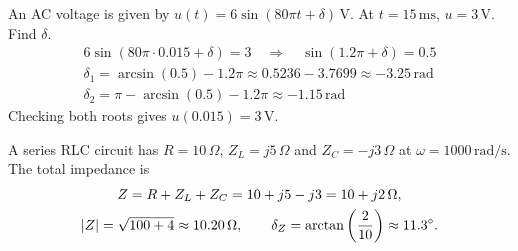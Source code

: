 \begin{exempel}
An AC voltage is given by $u(t) = 6\sin(80\pi t + \delta)\,\text{V}$. At $t = 15\,\text{ms}$,
$u = 3\,\text{V}$. Find $\delta$.
\begin{gather*}
  6\sin(80\pi \cdot 0.015 + \delta) = 3 \quad \Rightarrow \quad \sin(1.2\pi + \delta) = 0.5 \\
  \delta_1 = \arcsin(0.5) - 1.2\pi \approx 0.5236 - 3.7699 \approx -3.25\,\text{rad} \\
  \delta_2 = \pi - \arcsin(0.5) - 1.2\pi \approx -1.15\,\text{rad}
\end{gather*}
Checking both roots gives $u(0.015) = 3\,\text{V}$.
\end{exempel}

\begin{exempel}
A series RLC circuit has $R = 10\,\Omega$, $Z_L = j5\,\Omega$ and $Z_C = -j3\,\Omega$ at
$\omega = 1000\,\text{rad/s}$. The total impedance is
\begin{gather*}
  Z = R + Z_L + Z_C = 10 + j5 - j3 = 10 + j2\,\Omega, \\
  \lvert Z\rvert = \sqrt{100 + 4} \approx 10.20\,\Omega, \qquad
  \delta_Z = \arctan\left(\frac{2}{10}\right) \approx 11.3^{\circ}.
\end{gather*}
\end{exempel}
